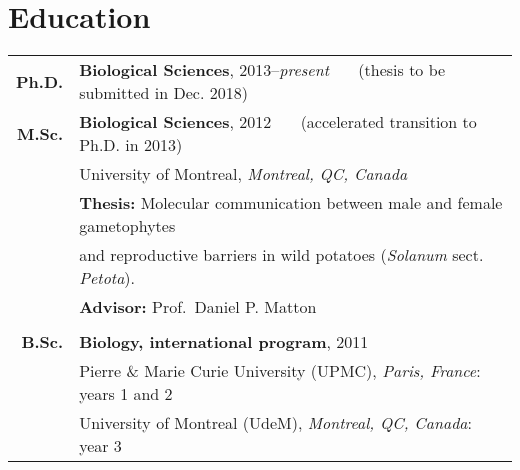 \documentclass[letterpaper,10pt]{article}
\begin{document}
\section{Education}
\begin{tabular}{r|p{15cm}}

  \textbf{Ph.D.}
  & \textbf{Biological Sciences}, 2013–\emph{present}
    ~~~\small{(thesis to be submitted in Dec. 2018)} \\

  \textbf{M.Sc.}
  & \textbf{Biological Sciences}, 2012
    ~~~\small{(accelerated transition to Ph.D. in 2013)} \vspace{0.5mm} \\
  & \hspace{1.5mm} University of Montreal, \emph{Montreal, QC, Canada} \\
  & \hspace{1.5mm} {\small \textbf{Thesis:} Molecular communication between male
  and female gametophytes} \\
  & \hspace{1.5mm} {\small \phantom{\textbf{Thesis:}} and reproductive barriers
  in wild potatoes (\emph{Solanum} sect. \emph{Petota}).} \\
  & \hspace{1.5mm} {\small \textbf{Advisor:} Prof.~Daniel P. Matton}
    \hspace{1mm} \\

  \multicolumn{2}{c}{} \\

  \textbf{B.Sc.}
  & \textbf{Biology, international program}, 2011 \vspace{0.5mm} \\
  & \hspace{1.5mm} Pierre \& Marie Curie University (UPMC),
    \emph{Paris, France}: years 1 and 2 \\
  & \hspace{1.5mm} University of Montreal (UdeM),
    \emph{Montreal, QC, Canada}: year 3 \\



\end{tabular}
\end{document}
